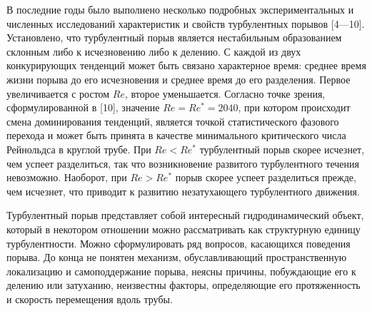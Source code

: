 \begin{comment}
Before getting to specific model equations, I need to discuss in a little more detail the physics of puffs and slugs. The understanding comes from the accumulation of a large number of studies. A representative sample would include Rotta (1956), Lindgren (1957, 1969), Wygnanski & Champagne (1973), Wygnanski et al. (1975), Bandyopadhyay (1986), Darbyshire & Mullin (1995), van Doorne & Westerweel (2009), Shimizu & Kida (2009), Duguet et al. (2010), Hof et al. (2010), Samanta et al. (2011), Holzner et al. (2013), Song et al. (2016). This is far from a complete list. I recommend particularly the papers by Wygnanski and coworkers (Wygnanski & Champagne 1973; Wygnanski et al. 1975), for their detailed content, and Holzner et al. (2013), Song et al. (2016) for their timely discussion of the literature and because they address interface motion in terms that are useful to me here. 
\end{comment}

В последние годы было выполнено несколько подробных экспериментальных и численных исследований характеристик и свойств турбулентных порывов [4---10]. Установлено, что турбулентный порыв является нестабильным образованием склонным либо к исчезновению либо к делению. С каждой из двух конкурирующих тенденций может быть связано характерное время: среднее время жизни порыва до его исчезновения и среднее время до его разделения. Первое увеличивается с ростом $Re$, второе уменьшается. Согласно точке зрения, сформулированной в [10], значение $Re=Re^*=2040$, при котором происходит смена доминирования тенденций, является точкой статистического фазового перехода и может быть принята в качестве минимального критического числа Рейнольдса в круглой трубе. При $Re<Re^*$ турбулентный порыв скорее исчезнет, чем успеет разделиться, так что возникновение развитого турбулентного течения невозможно. Наоборот, при $Re>Re^*$ порыв скорее успеет разделиться прежде, чем исчезнет, что приводит к развитию незатухающего турбулентного движения.

Турбулентный порыв представляет собой интересный гидродинамический объект, который в некотором отношении можно рассматривать как структурную единицу турбулентности. Можно сформулировать ряд вопросов, касающихся поведения порыва. До конца не понятен механизм, обуславливающий пространственную локализацию и самоподдержание порыва, неясны причины, побуждающие его к делению или затуханию, неизвестны факторы, определяющие его протяженность и скорость перемещения вдоль трубы.


